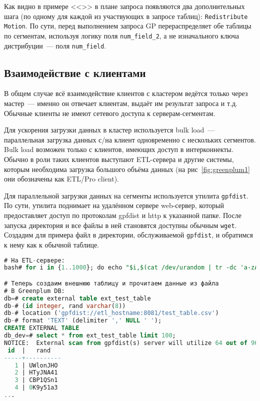 Как видно в примере <<>> в плане запроса появляются два дополнительных шага (по одному для каждой из участвующих в запросе таблиц): \lstinline!Redistribute Motion!. По сути, перед выполнением запроса GP перераспределяет обе таблицы по сегментам, используя логику поля \lstinline!num_field_2!, а не изначального ключа дистрибуции~--- поля \lstinline!num_field!.


\subsection{Взаимодействие с клиентами}

В общем случае всё взаимодействие клиентов с кластером ведётся только через мастер~--- именно он отвечает клиентам, выдаёт им результат запроса и т.д. Обычные клиенты не имеют сетевого доступа к серверам-сегментам.

Для ускорения загрузки данных в кластер используется bulk load~--- параллельная загрузка данных с/на клиент одновременно с нескольких сегментов. Bulk load возможен только с клиентов, имеющих доступ в интерконнекты. Обычно в роли таких клиентов выступают ETL-сервера и другие системы, которым необходима загрузка большого объёма данных (на рис~\ref{fig:greenplum1} они обозначены как ETL/Pro client).

Для параллельной загрузки данных на сегменты используется утилита \lstinline!gpfdist!. По сути, утилита поднимает на удалённом сервере web-сервер, который предоставляет доступ по протоколам gpfdist и http к указанной папке. После запуска директория и все файлы в ней становятся доступны обычным \lstinline!wget!. Создадим для примера файл в директории, обслуживаемой \lstinline!gpfdist!, и обратимся к нему как к обычной таблице.

\begin{lstlisting}[language=SQL,label=lst:greenplum_example4,caption=Пример с gpfdist]
# На ETL-сервере:
bash# for i in {1..1000}; do echo "$i,$(cat /dev/urandom | tr -dc 'a-zA-Z0-9' | fold -w 8 | head -n 1)"; done > /tmp/work/gpfdist_home/test_table.csv

# Теперь создаим внешнюю таблицу и прочитаем данные из файла
# В Greenplum DB:
db=# create external table ext_test_table
db-# (id integer, rand varchar(8))
db-# location ('gpfdist://etl_hostname:8081/test_table.csv')
db-# format 'TEXT' (delimiter ',' NULL ' ');
CREATE EXTERNAL TABLE
db_dev=# select * from ext_test_table limit 100;
NOTICE:  External scan from gpfdist(s) server will utilize 64 out of 96 segment databases
 id  |   rand
-----+----------
   1 | UWlonJHO
   2 | HTyJNA41
   3 | CBP1QSn1
   4 | 0K9y51a3
...
\end{lstlisting}

